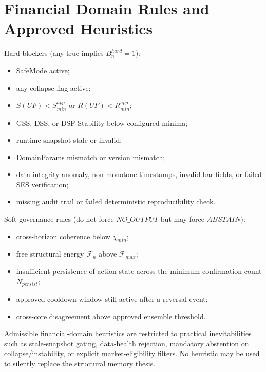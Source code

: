 \section{Financial Domain Rules and Approved Heuristics}

Hard blockers (any true implies $B_n^{hard}=1$):
\begin{itemize}
    \item SafeMode active;
    \item any collapse flag active;
    \item $S(UF)<S_{min}^{app}$ or $R(UF)<R_{min}^{app}$;
    \item GSS, DSS, or DSF-Stability below configured minima;
    \item runtime snapshot stale or invalid;
    \item DomainParams mismatch or version mismatch;
    \item data-integrity anomaly, non-monotone timestamps, invalid bar fields, or failed SES verification;
    \item missing audit trail or failed deterministic reproducibility check.
\end{itemize}

Soft governance rules (do not force $NO\_OUTPUT$ but may force $ABSTAIN$):
\begin{itemize}
    \item cross-horizon coherence below $\chi_{min}$;
    \item free structural energy $\mathcal{F}_n$ above $\mathcal{F}_{max}$;
    \item insufficient persistence of action state across the minimum confirmation count $N_{persist}$;
    \item approved cooldown window still active after a reversal event;
    \item cross-core disagreement above approved ensemble threshold.
\end{itemize}

Admissible financial-domain heuristics are restricted to practical inevitabilities such as stale-snapshot gating, data-health rejection, mandatory abstention on collapse/instability, or explicit market-eligibility filters. No heuristic may be used to silently replace the structural memory thesis.

